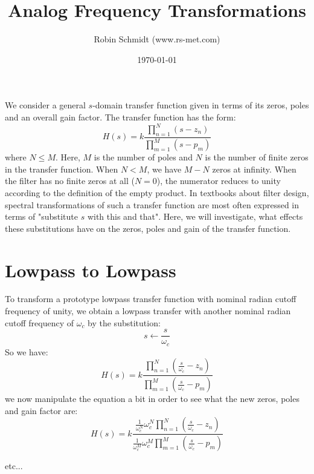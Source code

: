 \title{Analog Frequency Transformations}
\author{Robin Schmidt (www.rs-met.com)}
\date{\today}
\maketitle

We consider a general $s$-domain transfer function given in terms of its zeros, poles and an overall gain factor. The transfer function has the form:
\begin{equation}
H(s) = k \frac{\prod_{n=1}^N (s - z_n)} {\prod_{m=1}^M (s - p_m)}
\end{equation}
where $N \leq M$. Here, $M$ is the number of poles and $N$ is the number of finite zeros in the transfer function. When $N < M$, we have $M-N$ zeros at infinity. When the filter has no finite zeros at all ($N=0$), the numerator reduces to unity according to the definition of the empty product. In textbooks about filter design, spectral transformations of such a transfer function are most often expressed in terms of "substitute $s$ with this and that". Here, we will investigate, what effects these substitutions have on the zeros, poles and gain of the transfer function.

\section{Lowpass to Lowpass}
To transform a prototype lowpass transfer function with nominal radian cutoff frequency of unity, we obtain a lowpass transfer with another nominal radian cutoff frequency of $\omega_c$ by the substitution:
\begin{equation}
 s \leftarrow \frac{s}{\omega_c}
\end{equation}
So we have:
\begin{equation}
H(s) = k \frac{\prod_{n=1}^N (\frac{s}{\omega_c} - z_n)} {\prod_{m=1}^M (\frac{s}{\omega_c} - p_m)}
\end{equation}
we now manipulate the equation a bit in order to see what the new zeros, poles and gain factor are:
\begin{equation}
H(s) = k  \frac{ \frac{1}{\omega_c^N} \omega_c^N \prod_{n=1}^N (\frac{s}{\omega_c} - z_n)} 
               { \frac{1}{\omega_c^M} \omega_c^M \prod_{m=1}^M (\frac{s}{\omega_c} - p_m)}
\end{equation}

etc...





